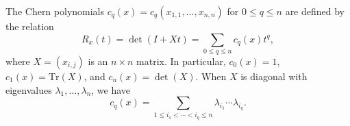 The Chern polynomials $c_q(x) = c_q(x_{1,1}, \ldots, x_{n,n})$ for $0 \leq q \leq n$ are defined by the relation
$$
R_x(t) = \det(I + Xt) = \sum_{0 \leq q \leq n} c_q(x) t^q,
$$
where $X = (x_{i,j})$ is an $n \times n$ matrix. In particular, $c_0(x) = 1$, $c_1(x) = \text{Tr}(X)$, and $c_n(x) = \det(X)$. When $X$ is diagonal with eigenvalues $\lambda_1, \ldots, \lambda_n$, we have
$$
c_q(x) = \sum_{1 \leq i_1 < \cdots < i_q \leq n} \lambda_{i_1} \cdots \lambda_{i_q}.
$$
